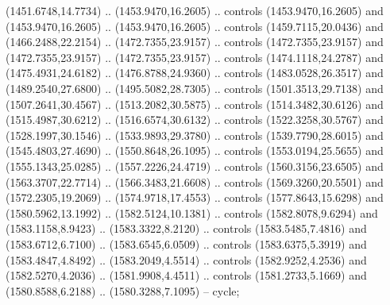 \begin{scope}[shift={(19.44451,-318.97965)}]
\begin{scope}[shift={(-2093.8013,-1176.4989)}]
\begin{scope}
\begin{scope}
\begin{scope}[shift={(1261.8671,1726.9965)}]
            (1451.6748,14.7734) .. (1453.9470,16.2605) .. controls (1453.9470,16.2605) and
            (1453.9470,16.2605) .. (1453.9470,16.2605) .. controls (1459.7115,20.0436) and
            (1466.2488,22.2154) .. (1472.7355,23.9157) .. controls (1472.7355,23.9157) and
            (1472.7355,23.9157) .. (1472.7355,23.9157) .. controls (1474.1118,24.2787) and
            (1475.4931,24.6182) .. (1476.8788,24.9360) .. controls (1483.0528,26.3517) and
            (1489.2540,27.6800) .. (1495.5082,28.7305) .. controls (1501.3513,29.7138) and
            (1507.2641,30.4567) .. (1513.2082,30.5875) .. controls (1514.3482,30.6126) and
            (1515.4987,30.6212) .. (1516.6574,30.6132) .. controls (1522.3258,30.5767) and
            (1528.1997,30.1546) .. (1533.9893,29.3780) .. controls (1539.7790,28.6015) and
            (1545.4803,27.4690) .. (1550.8648,26.1095) .. controls (1553.0194,25.5655) and
            (1555.1343,25.0285) .. (1557.2226,24.4719) .. controls (1560.3156,23.6505) and
            (1563.3707,22.7714) .. (1566.3483,21.6608) .. controls (1569.3260,20.5501) and
            (1572.2305,19.2069) .. (1574.9718,17.4553) .. controls (1577.8643,15.6298) and
            (1580.5962,13.1992) .. (1582.5124,10.1381) .. controls (1582.8078,9.6294) and
            (1583.1158,8.9423) .. (1583.3322,8.2120) .. controls (1583.5485,7.4816) and
            (1583.6712,6.7100) .. (1583.6545,6.0509) .. controls (1583.6375,5.3919) and
            (1583.4847,4.8492) .. (1583.2049,4.5514) .. controls (1582.9252,4.2536) and
            (1582.5270,4.2036) .. (1581.9908,4.4511) .. controls (1581.2733,5.1669) and
            (1580.8588,6.2188) .. (1580.3288,7.1095) -- cycle;


\end{scope}
\end{scope}
\end{scope}
\end{scope}
\end{scope}
